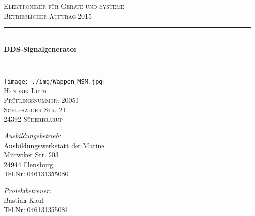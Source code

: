 \begin{center}
\textsc{\LARGE Elektroniker für Geräte und Systeme \\[0.5cm] Betrieblicher Auftrag 2015}\\[1cm]

\newcommand{\HRule}{\rule{\linewidth}{0.5mm}}
\HRule \\[0.4cm]
{ \huge \bfseries DDS-Signalgenerator}\\[0.4cm]

\HRule \\[1cm]

\texttt{[image: ./img/Wappen\_MSM.jpg]}\\[1cm]    

\textsc{\LARGE Hendrik Lüth \\ Prüflingsnummer: 20050}\\[0.5cm]

\textsc{\Large Schleswiger Str. 21 \\ 24392 Süderbrarup}\\[1.5cm]

\hfill


\begin{minipage}{0.5\textwidth}
\begin{flushleft} \large
\emph{Ausbildungsbetrieb:}\\
Ausbildungswerkstatt der Marine\\
Mürwiker Str. 203\\
24944 Flensburg\\
Tel.Nr: 046131355080
\end{flushleft}
\end{minipage}
\hfill
\begin{minipage}{0.4\textwidth}
\begin{flushright} \large
\hfill
\emph{Projektbetreuer:} \\
Bastian Kaul\\
Tel.Nr: 046131355081
\end{flushright}
\end{minipage}

\end{center}